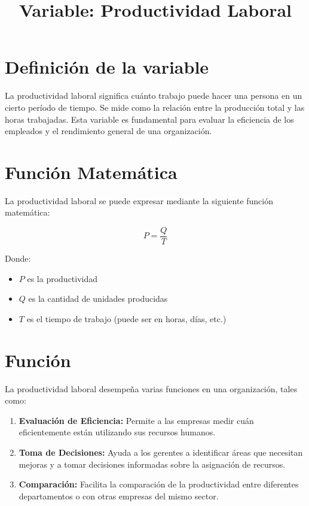 \documentclass[]{article}
\title{\textbf{Variable: Productividad Laboral}}
\date{}
\begin{document}
	
	\maketitle
	\section*{Definición de la variable}
	
	La productividad laboral significa cuánto trabajo puede hacer una persona en un cierto período de tiempo. Se mide como la relación entre la producción total y las horas trabajadas. Esta variable es fundamental para evaluar la eficiencia de los empleados y el rendimiento general de una organización.
	
	\section*{Función Matemática}
	
	La productividad laboral se puede expresar mediante la siguiente función matemática:
	
	\[
	P = \frac{Q}{T}
	\]
	
	Donde:
	\begin{itemize}
		\item $P$ es la productividad
		\item $Q$ es la cantidad de unidades producidas
		\item $T$ es el tiempo de trabajo (puede ser en horas, días, etc.)
	\end{itemize}
	
	\section*{Función}
	
	La productividad laboral desempeña varias funciones en una organización, tales como:
	
	\begin{enumerate}
		\item \textbf{Evaluación de Eficiencia:} Permite a las empresas medir cuán eficientemente están utilizando sus recursos humanos.
		\item \textbf{Toma de Decisiones:} Ayuda a los gerentes a identificar áreas que necesitan mejoras y a tomar decisiones informadas sobre la asignación de recursos.
		\item \textbf{Comparación:} Facilita la comparación de la productividad entre diferentes departamentos o con otras empresas del mismo sector.
	\end{enumerate}
	
\end{document}
